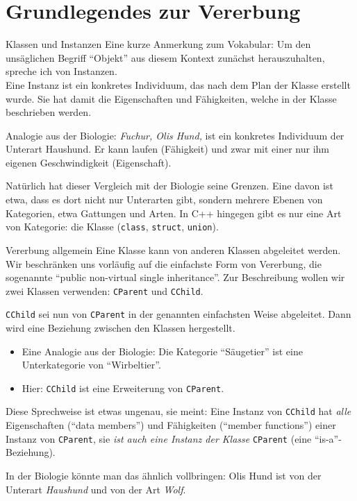 \section{Grundlegendes zur Vererbung}

\begin{frame}[fragile]{Klassen und Instanzen}
	Eine kurze Anmerkung zum Vokabular: Um den unsäglichen Begriff \enquote{Objekt} aus diesem Kontext zunächst herauszuhalten, spreche ich von Instanzen.\\
	Eine Instanz ist ein konkretes Individuum, das nach dem Plan der Klasse erstellt wurde. Sie hat damit die Eigenschaften und Fähigkeiten, welche in der Klasse beschrieben werden.
	
	Analogie aus der Biologie: \emph{Fuchur, Olis Hund,} ist ein konkretes Individuum der Unterart Haushund. Er kann laufen (Fähigkeit) und zwar mit einer nur ihm eigenen Geschwindigkeit (Eigenschaft).
	
	\vspace{1em}
	
	Natürlich hat dieser Vergleich mit der Biologie seine Grenzen. Eine davon ist etwa, dass es dort nicht nur Unterarten gibt, sondern mehrere Ebenen von Kategorien, etwa Gattungen und Arten. In C++ hingegen gibt es nur eine Art von Kategorie: die Klasse (\verb|class|, \verb|struct|, \verb|union|).
\end{frame}

\begin{frame}[fragile]{Vererbung allgemein}
	Eine Klasse kann von anderen Klassen abgeleitet werden. Wir beschränken uns vorläufig auf die einfachste Form von Vererbung, die sogenannte \enquote{public non-virtual single inheritance}. Zur Beschreibung wollen wir zwei Klassen verwenden: \verb|CParent| und \verb|CChild|.
	
	\pause
	
	\verb|CChild| sei nun von \verb|CParent| in der genannten einfachsten Weise abgeleitet. Dann wird eine Beziehung zwischen den Klassen hergestellt.
	\begin{itemize}
		\item Eine Analogie aus der Biologie: Die Kategorie \enquote{Säugetier} ist eine Unterkategorie von \enquote{Wirbeltier}.
		\item Hier: \verb|CChild| ist eine Erweiterung von \verb|CParent|.
	\end{itemize}
	
	\pause
	
	\small
	Diese Sprechweise ist etwas ungenau, sie meint: Eine Instanz von \verb|CChild| hat \emph{alle} Eigenschaften (\enquote{data members}) und Fähigkeiten (\enquote{member functions}) einer Instanz von \verb|CParent|, sie \emph{ist auch eine Instanz der Klasse} \verb|CParent| (eine \enquote{is-a}-Beziehung).
	
	In der Biologie könnte man das ähnlich vollbringen: Olis Hund ist von der Unterart \emph{Haushund} und von der Art \emph{Wolf}.
\end{frame}

